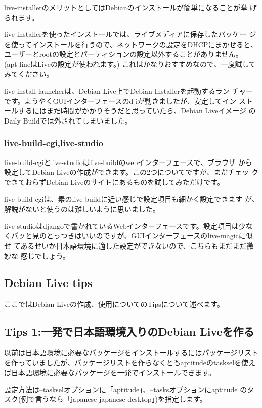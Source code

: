 \documentclass[mingoth,a4paper]{jsarticle}
\begin{document}
live-installerのメリットとしてはDebianのインストールが簡単になることが挙
げられます。

live-installerを使ったインストールでは、ライブメディアに保存したパッケー
ジを使ってインストールを行うので、ネットワークの設定をDHCPにまかせると、
ユーザーとrootの設定とパーティションの設定以外することがありません。
(apt-lineはLiveの設定が使われます。)
これはかなりおすすめなので、一度試してみてください。

live-install-launcherは、Debian Live上でDebian Installerを起動するラン
チャーです。ようやくGUIインターフェースのd-iが動きましたが、安定してイン
ストールするにはまだ時間がかかりそうだと思っていたら、Debian Liveイメージ
のDaily Buildでは外されてしまいました。

\subsubsection{live-build-cgi,live-studio}

live-build-cgiとlive-studioはlive-buildのwebインターフェースで、ブラウザ
から設定してDebian Liveの作成ができます。この2つについてですが、まだチェッ
クできておらずDebian Liveのサイトにあるものを試してみただけです。

live-build-cgiは、素のlive-buildに近い感じで設定項目も細かく設定できます
が、解説がないと使うのは難しいように思いました。

live-studioはdjangoで書かれているWebインターフェースです。設定項目は少な
くパッと見のとっつきはいいのですが、GUIインターフェースのlive-magicに似せ
てあるせいか日本語環境に適した設定ができないので、こちらもまだまだ微妙な
感じでしょう。

\subsection{Debian Live tips}
ここではDebian Liveの作成、使用についてのTipsについて述べます。

\subsection{Tips 1:一発で日本語環境入りのDebian Liveを作る}

以前は日本語環境に必要なパッケージをインストールするにはパッケージリスト
を作っていましたが、パッケージリストを作らなくともaptitudeのtaskselを使え
ば日本語環境に必要なパッケージを一発でインストールできます。

設定方法は--taskselオプションに「aptitude」、--tasksオプションにaptitude
のタスク(例で言うなら「japanese japanese-desktop」)を指定します。
\end{document}
